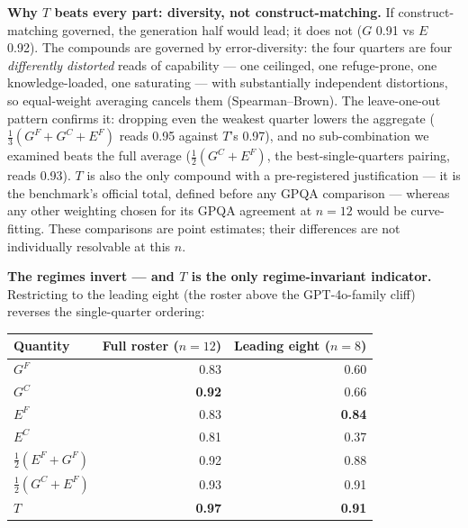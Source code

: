 \textbf{Why \(T\) beats every part: diversity, not construct-matching.} If construct-matching governed, the generation half would lead; it does not (\(G\) 0.91 vs \(E\) 0.92). The compounds are governed by error-diversity: the four quarters are four \emph{differently distorted} reads of capability --- one ceilinged, one refuge-prone, one knowledge-loaded, one saturating --- with substantially independent distortions, so equal-weight averaging cancels them (Spearman--Brown). The leave-one-out pattern confirms it: dropping even the weakest quarter lowers the aggregate (\(\tfrac13(G^{F}+G^{C}+E^{F})\) reads 0.95 against \(T\)'s 0.97), and no sub-combination we examined beats the full average (\(\tfrac12(G^{C}+E^{F})\), the best-single-quarters pairing, reads 0.93). \(T\) is also the only compound with a pre-registered justification --- it is the benchmark's official total, defined before any GPQA comparison --- whereas any other weighting chosen for its GPQA agreement at \(n = 12\) would be curve-fitting. These comparisons are point estimates; their differences are not individually resolvable at this \(n\).

\textbf{The regimes invert --- and \(T\) is the only regime-invariant indicator.} Restricting to the leading eight (the roster above the GPT-4o-family cliff) reverses the single-quarter ordering:

{\def\LTcaptype{none} %
\begin{longtable}[]{@{}lrr@{}}
\toprule\noalign{}
Quantity & Full roster (\(n=12\)) & Leading eight (\(n=8\)) \\
\midrule\noalign{}
\endhead
\bottomrule\noalign{}
\endlastfoot
\(G^{F}\) & 0.83 & 0.60 \\
\(G^{C}\) & \textbf{0.92} & 0.66 \\
\(E^{F}\) & 0.83 & \textbf{0.84} \\
\(E^{C}\) & 0.81 & 0.37 \\
\(\tfrac12(E^{F}+G^{F})\) & 0.92 & 0.88 \\
\(\tfrac12(G^{C}+E^{F})\) & 0.93 & 0.91 \\
\(T\) & \textbf{0.97} & \textbf{0.91} \\
\end{longtable}
}

